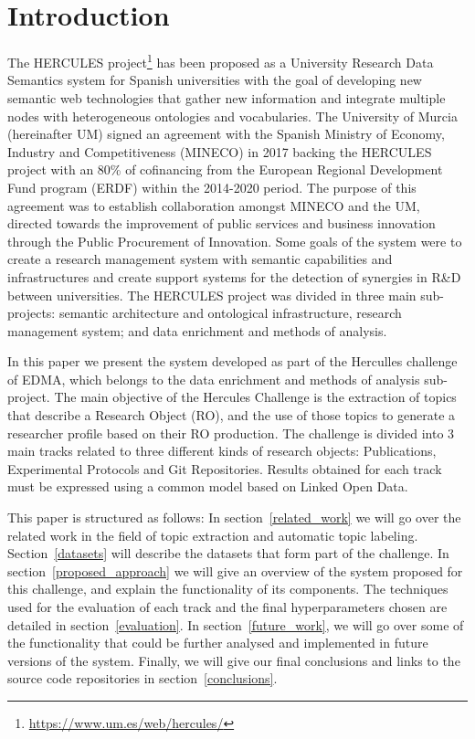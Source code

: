 \documentclass[runningheads]{llncs}
\begin{document}
\section{Introduction}
The HERCULES project\footnote{\url{https://www.um.es/web/hercules/}} has been proposed as a University Research Data Semantics system for Spanish universities with the goal of developing new semantic  web technologies that gather new  information and integrate multiple nodes with heterogeneous ontologies and vocabularies. The University of Murcia (hereinafter UM) signed an agreement with the Spanish Ministry of Economy, Industry and Competitiveness (MINECO) in 2017 backing the HERCULES project with an 80\% of cofinancing from the European Regional Development Fund program (ERDF) within the 2014-2020 period. The purpose of this agreement was to establish collaboration amongst MINECO and the UM,  directed towards the improvement of public services and business innovation through the Public Procurement of Innovation. Some goals of the system were to create a research management system with semantic capabilities and infrastructures and create support systems for the detection of synergies in R\&D between universities. The HERCULES project was divided in three main sub-projects: semantic architecture and ontological  infrastructure, research management system; and data enrichment and methods of analysis.

In this paper we present the system developed as part of the Herculles challenge of EDMA, which belongs to the data enrichment and methods of analysis sub-project. The main objective of the Hercules Challenge is the extraction of topics that describe a Research Object (RO), and the use of those topics to generate a researcher profile based on their RO production. The challenge is divided into 3 main tracks related to three different kinds of research objects: Publications, Experimental Protocols and Git Repositories. Results obtained for each track must be expressed using a common model based on Linked Open Data.

This paper is structured as follows: In section~\ref{related_work} we will go over the related work in the field of topic extraction and automatic topic labeling. Section~\ref{datasets} will describe the datasets that form part of the challenge. In section~\ref{proposed_approach} we will give an overview of the system proposed for this challenge, and explain the functionality of its components. The techniques used for the evaluation of each track and the final hyperparameters chosen are detailed in section~\ref{evaluation}. In section~\ref{future_work}, we will go over some of the functionality that could be further analysed and implemented in future versions of the system. Finally, we will give our final conclusions and links to the source code repositories in section~\ref{conclusions}. 
\end{document}
